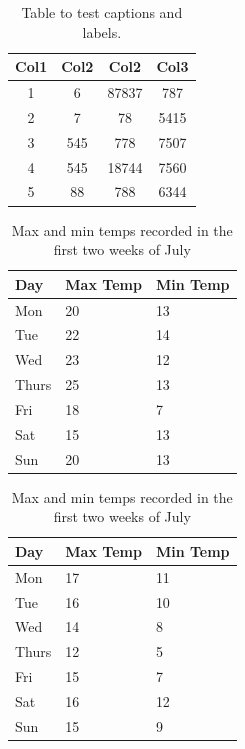 \documentclass[a4paper,11pt]{report}    %
\begin{document}
\begin{table}[H]
\centering
\begin{tabular}{||c c c c||}
 \hline
 Col1 & Col2 & Col2 & Col3 \\ [0.5ex]
 \hline\hline
 1 & 6 & 87837 & 787 \\
 2 & 7 & 78 & 5415 \\
 3 & 545 & 778 & 7507 \\
 4 & 545 & 18744 & 7560 \\
 5 & 88 & 788 & 6344 \\ [1ex]
 \hline
\end{tabular}
\caption{Table to test captions and labels.}
\label{table:1}
\end{table}

\begin{table}[H]
    \begin{subtable}[h]{0.45\textwidth}
        \centering
        \begin{tabular}{l | l | l}
        Day & Max Temp & Min Temp \\
        \hline \hline
        Mon & 20 & 13\\
        Tue & 22 & 14\\
        Wed & 23 & 12\\
        Thurs & 25 & 13\\
        Fri & 18 & 7\\
        Sat & 15 & 13\\
        Sun & 20 & 13
       \end{tabular}
       \caption{First Week}
       \label{subtab:week1}
    \end{subtable}%
    \hfill
    \begin{subtable}[h]{0.45\textwidth}
        \centering
        \begin{tabular}{l | l | l}
        Day & Max Temp & Min Temp \\
        \hline \hline
        Mon & 17 & 11\\
        Tue & 16 & 10\\
        Wed & 14 & 8\\
        Thurs & 12 & 5\\
        Fri & 15 & 7\\
        Sat & 16 & 12\\
        Sun & 15 & 9
        \end{tabular}
        \caption{Second Week}
        \label{subtab:week2}
     \end{subtable}
     \caption{Max and min temps recorded in the first two weeks of July}
     \label{tab:temps}
\end{table}
\end{document}
